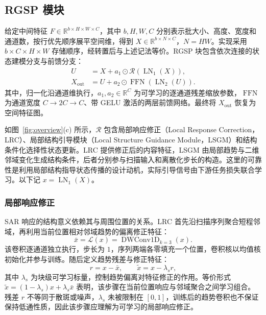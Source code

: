 \documentclass[journal]{IEEEtran}
\begin{document}
\subsection{RGSP 模块}
\label{sec:rgsp}

给定中间特征 $F\in\mathbb{R}^{b\times H\times W\times C}$，其中 $b,H,W,C$ 分别表示批大小、高度、宽度和通道数，按行优先顺序展平空间维，得到 $X\in\mathbb{R}^{b\times N\times C}$，$N=HW$。实现采用 $b\times C\times H\times W$ 存储顺序，经转置后与上述记法等价。RGSP 块包含依次连接的状态建模分支与前馈分支：
\begin{equation}
\begin{aligned}
U
&=X+a_1\odot
\mathcal{R}\!\left(\operatorname{LN}_1(X)\right),\\
X_{\mathrm{out}}
&=U+a_2\odot
\operatorname{FFN}\!\left(\operatorname{LN}_2(U)\right).
\end{aligned}
\label{eq:rgsp_block}
\end{equation}
其中，归一化沿通道维执行，$a_1,a_2\in\mathbb{R}^{C}$ 为可学习的逐通道残差缩放参数，$\operatorname{FFN}$ 为通道宽度 $C\rightarrow2C\rightarrow C$、带 GELU 激活的两层前馈网络。最终将 $X_{\mathrm{out}}$ 恢复为空间特征图。

如图~\ref{fig:overview}(c) 所示，$\mathcal{R}$ 包含局部响应修正（Local Response Correction，LRC）、局部结构引导模块（Local Structure Guidance Module，LSGM）和结构条件化选择性状态更新。LRC 提供修正后的内容特征，LSGM 由局部趋势与二维邻域变化生成结构条件，后者分别参与扫描输入和离散化步长的构造。这里的可靠性是利用局部结构指导状态传播的设计动机，实际引导信号由下游任务损失联合学习。以下记 $x=\operatorname{LN}_1(X)$。


\subsubsection{局部响应修正}
\label{sec:lrc}

SAR 响应的结构意义依赖其与周围位置的关系。LRC 首先沿扫描序列聚合短程邻域，再利用当前位置相对邻域趋势的偏离修正特征：
\begin{equation}
\bar{x}
=\mathcal{L}(x)
=\operatorname{DWConv1D}_{k=3}(x).
\label{eq:local_trend}
\end{equation}
该卷积逐通道独立执行，步长为 $1$，序列两端各零填充一个位置，卷积核以均值核初始化并参与训练。随后定义趋势残差与修正特征：
\begin{equation}
r=x-\bar{x},
\qquad
\tilde{x}=x-\lambda_s r,
\label{eq:residual}
\end{equation}
其中 $\lambda_s$ 为块级可学习标量，控制趋势偏离对特征修正的作用。等价形式 $\tilde{x}=(1-\lambda_s)x+\lambda_s\bar{x}$ 表明，该步骤在当前位置响应与邻域聚合之间学习组合。残差 $r$ 不等同于散斑或噪声，$\lambda_s$ 未被限制在 $[0,1]$，训练后的趋势卷积也不保证保持低通性质，因此该步骤应理解为可学习的局部响应修正。
\end{document}
